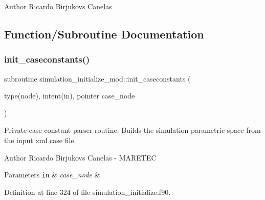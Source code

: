 \begin{DoxyAuthor}{Author}
Ricardo Birjukovs Canelas 
\end{DoxyAuthor}


\subsection{Function/\+Subroutine Documentation}
\mbox{\label{namespacesimulation__initialize__mod_a97705c918360827c6fc76170b5eeb9bb}} 
\subsubsection{\texorpdfstring{init\+\_\+caseconstants()}{init\_caseconstants()}}
{\footnotesize\ttfamily subroutine simulation\+\_\+initialize\+\_\+mod\+::init\+\_\+caseconstants (\begin{DoxyParamCaption}\item[{type(node), intent(in), pointer}]{case\+\_\+node }\end{DoxyParamCaption})\hspace{0.3cm}{\ttfamily [private]}}



Private case constant parser routine. Builds the simulation parametric space from the input xml case file. 

\begin{DoxyAuthor}{Author}
Ricardo Birjukovs Canelas -\/ M\+A\+R\+E\+T\+EC 
\end{DoxyAuthor}

\begin{DoxyParams}[1]{Parameters}
\mbox{\tt in}  & {\em case\+\_\+node} & \\
\hline
\end{DoxyParams}


Definition at line 324 of file simulation\+\_\+initialize.\+f90.


